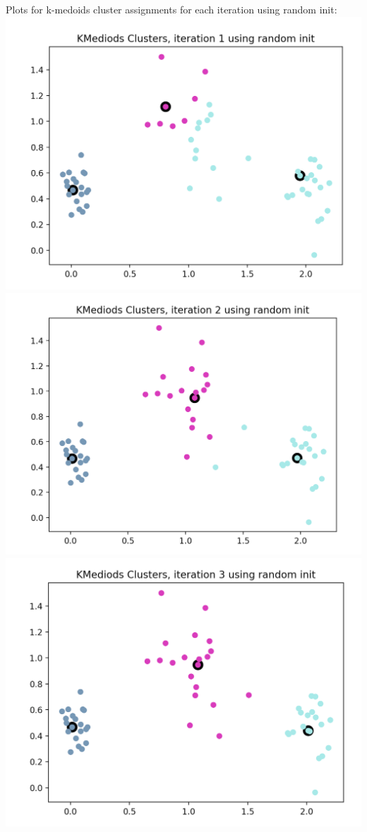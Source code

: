 \documentclass[11pt]{article}
\newcommand{\solution}[1]{{{\color{blue}{\bf Solution:} {#1}}}}
\begin{document}
\solution{
Plots for k-medoids cluster assignments for each iteration using random init: \newline{}
\includegraphics[scale=0.5]{kmed-rand-iter-1.png} \newline{}
\includegraphics[scale=0.5]{kmed-rand-iter-2.png} \newline{}
\includegraphics[scale=0.5]{kmed-rand-iter-3.png} \newline{}
}
\end{document}
